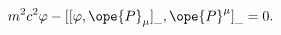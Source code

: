 \begin{equation}	\label{12.131}
m^2c^2\varphi
-
[ [
	\varphi,\ope{P}_\mu ]_{\_},\ope{P}^\mu
]_{\_}
= 0 .
	\end{equation}

